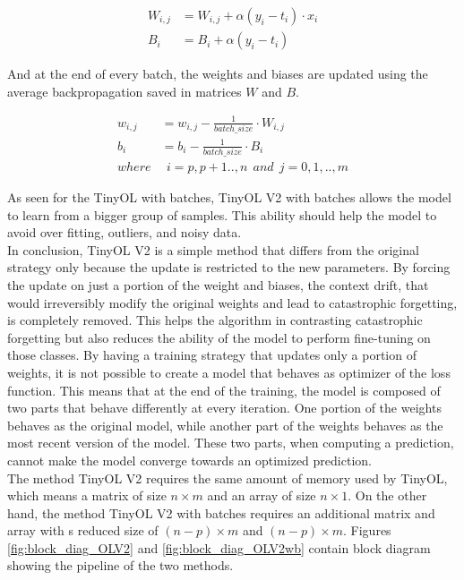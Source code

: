 \documentclass[12pt]{report}
\begin{document}
\begin{align}
    W_{i,j} &= W_{i,j} + \alpha (y_i - t_i) \cdot x_i \\
    B_i     &= B_i + \alpha  (y_i - t_i) 
\end{align}

And at the end of every batch, the weights and biases are updated using the average backpropagation saved in matrices $W$ and $B$.

\begin{align}
    w_{i,j} &= w_{i,j} - \frac{1}{batch\_size} \cdot W_{i,j} \\
    b_i 	    &= b_i - \frac{1}{batch\_size} \cdot B_i \\
    where   & \: \: i= p,p+1..,n  \: \: and \: \:  j=0,1,..,m \nonumber  
\end{align}

As seen for the TinyOL with batches, TinyOL V2 with batches allows the model to learn from a bigger group of samples. This ability should help the model to avoid over fitting, outliers, and noisy data. \\
In conclusion, TinyOL V2 is a simple method that differs from the original strategy only because the update is restricted to the new parameters.  By forcing the update on just a portion of the weight and biases, the context drift, that would irreversibly modify the original weights and lead to catastrophic forgetting, is completely removed. This helps the algorithm in contrasting catastrophic forgetting but also reduces the ability of the model to perform fine-tuning on those classes. By having a training strategy that updates only a portion of weights, it is not possible to create a model that behaves as optimizer of the loss function. This means that at the end of the training, the model is composed of two parts that behave differently at every iteration. One portion of the weights behaves as the original model, while another part of the weights behaves as the most recent version of the model. These two parts, when computing a prediction, cannot make the model converge towards an optimized prediction. \\
The method TinyOL V2 requires the same amount of memory used by TinyOL, which means a matrix of size $n \times m$ and an array of size $n \times 1$. On the other hand, the method TinyOL V2 with batches requires an additional matrix and array with s reduced size of $(n-p) \times m$ and $(n-p) \times m$. Figures \ref{fig:block_diag_OLV2} and \ref{fig:block_diag_OLV2wb} contain block diagram showing the pipeline of the two methods.
\end{document}
